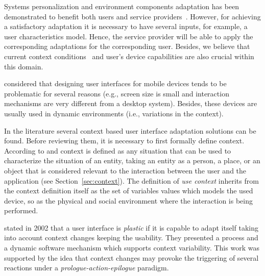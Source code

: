 Systems personalization and environment components adaptation has been demonstrated
to benefit both users and service providers~\citep{kobsa_generic_2001}. However, for
achieving a satisfactory adaptation it is necessary to have several inputs, for example,
a user characteristics model. Hence, the service provider will be able to apply the
corresponding adaptations for the corresponding user. Besides, we believe that current
context conditions~\citep{jameson_modelling_2001} and user's device capabilities are also
crucial within this domain. 

\citet{nilsson_model_based_2006} considered that designing user interfaces for
mobile devices tends to be problematic for several reasons (e.g., screen size is
small and interaction mechanisms are very different from a desktop system). Besides,
these devices are usually used in dynamic environments (i.e., variations in the
context). 

In the literature several context based user interface adaptation solutions can 
be found. Before reviewing them, it is necessary to first formally define context.
According to \citet{weerawarana_bean_2001} and \citet{dey_understanding_2001} 
context is defined as any situation that can be used to characterize the situation 
of an entity, taking an entity as a person, a place, or an object that is considered
relevant to the interaction between the user and the application (see
Section~\ref{sec:context}). The definition of \textit{use context} inherits from
the context definition itself as the set of variables values which models the
used device, so as the physical and social environment where the interaction is
being performed.

\citet{calvary_plasticity_2002} stated in 2002 that a user interface is \textit{plastic}
if it is capable to adapt itself taking into account context changes keeping
the usability. They presented a process and a dynamic software mechanism which
supports context variability. This work was supported by the idea that context
changes may provoke the triggering of several reactions under a \textit{prologue-action-epilogue}
paradigm. 

